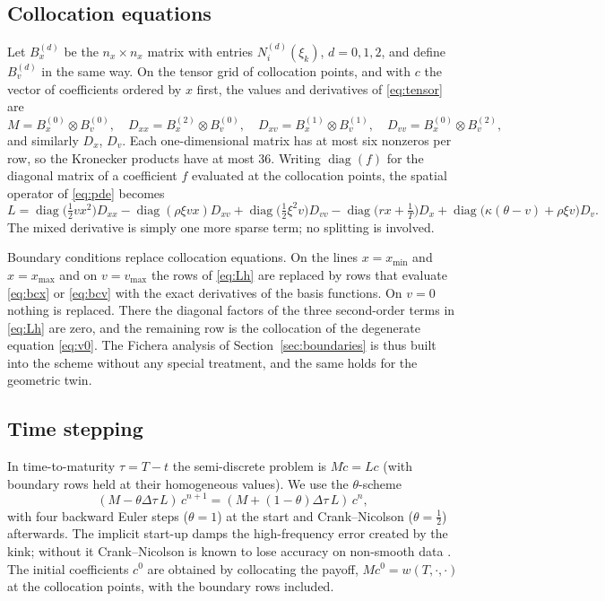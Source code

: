 \subsection{Collocation equations}

Let $B^{(d)}_x$ be the $n_x\times n_x$ matrix with entries $N_i^{(d)}(\xi_k)$, $d=0,1,2$, and define
$B^{(d)}_v$ in the same way. On the tensor grid of collocation points, and with $c$ the vector of
coefficients ordered by $x$ first, the values and derivatives of \eqref{eq:tensor} are
\begin{equation*}
M = B^{(0)}_x\otimes B^{(0)}_v,\quad
D_{xx} = B^{(2)}_x\otimes B^{(0)}_v,\quad
D_{xv} = B^{(1)}_x\otimes B^{(1)}_v,\quad
D_{vv} = B^{(0)}_x\otimes B^{(2)}_v,
\end{equation*}
and similarly $D_x$, $D_v$. Each one-dimensional matrix has at most six nonzeros per row, so the
Kronecker products have at most 36. Writing $\operatorname{diag}(f)$ for the diagonal matrix of a
coefficient $f$ evaluated at the collocation points, the spatial operator of \eqref{eq:pde} becomes
\begin{equation}\label{eq:Lh}
L = \operatorname{diag}\bigl(\tfrac12 v x^2\bigr)D_{xx} - \operatorname{diag}(\rho\xi v x)D_{xv}
+ \operatorname{diag}\bigl(\tfrac12\xi^2 v\bigr)D_{vv} - \operatorname{diag}\bigl(rx+\tfrac1T\bigr)D_x
+ \operatorname{diag}\bigl(\kappa(\theta-v)+\rho\xi v\bigr)D_v .
\end{equation}
The mixed derivative is simply one more sparse term; no splitting is involved.

Boundary conditions replace collocation equations. On the lines $x=x_{\min}$ and $x=x_{\max}$ and on
$v=v_{\max}$ the rows of \eqref{eq:Lh} are replaced by rows that evaluate \eqref{eq:bcx} or \eqref{eq:bcv}
with the exact derivatives of the basis functions. On $v=0$ nothing is replaced. There the diagonal
factors of the three second-order terms in \eqref{eq:Lh} are zero, and the remaining row is the
collocation of the degenerate equation \eqref{eq:v0}. The Fichera analysis of
Section~\ref{sec:boundaries} is thus built into the scheme without any special treatment, and the same
holds for the geometric twin.

\subsection{Time stepping}

In time-to-maturity $\tau=T-t$ the semi-discrete problem is $M\dot c = Lc$ (with boundary rows held at
their homogeneous values). We use the $\theta$-scheme
\begin{equation}\label{eq:theta}
(M - \theta\Delta\tau\,L)\,c^{n+1} = (M + (1-\theta)\Delta\tau\,L)\,c^n ,
\end{equation}
with four backward Euler steps ($\theta=1$) at the start and Crank--Nicolson ($\theta=\tfrac12$)
afterwards. The implicit start-up \citep{Rannacher1984} damps the high-frequency error created by the
kink; without it Crank--Nicolson is known to lose accuracy on non-smooth data
\citep{PooleyVetzalForsyth2003}. The initial coefficients $c^0$ are obtained by collocating the payoff,
$Mc^0 = w(T,\cdot,\cdot)$ at the collocation points, with the boundary rows included.

